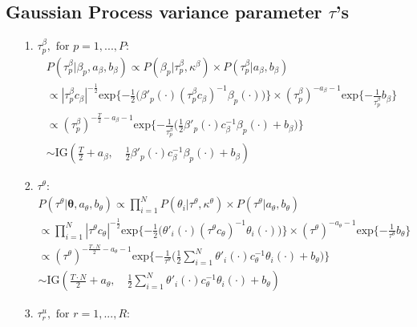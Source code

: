 \documentclass[a4paper]{article}
\begin{document}
\subsection{Gaussian Process variance parameter $\tau$'s} \label{tau}		
\begin{itemize}
	\item [1.] $\tau^{\beta}_p, \mbox{ for } p=1,...,P$:
\begin{equation*}
\begin{aligned}
&P(\tau^{\beta}_p|\beta_p, a_\beta, b_\beta) \propto P(\beta_p|\tau^{\beta}_p, \kappa^\beta) \times P(\tau^{\beta}_p|a_\beta, b_\beta) \\
&\propto|\tau^{\beta}_pc_\beta|^{-\frac{1}{2}}\mbox{exp}\{-\frac{1}{2}\Big(\beta'_p(\cdot)(\tau^{\beta}_pc_\beta)^{-1}\beta_p(\cdot)\Big)\}\times (\tau^{\beta}_p)^{-a_\beta-1}\mbox{exp}\{-\frac{1}{\tau^{\beta}_p}b_\beta\}\\
&\propto(\tau^{\beta}_p)^{-\frac{T}{2}-a_\beta-1}\mbox{exp}\{-\frac{1}{\tau^{\beta}_p}\Big(\frac{1}{2}\beta'_p(\cdot)c_\beta^{-1}\beta_p(\cdot)+b_\beta\Big)\}\\
&\sim \mbox{IG}(\frac{T}{2}+a_\beta,\quad \frac{1}{2}\beta'_p(\cdot)c_\beta^{-1}\beta_p(\cdot)+b_\beta)	
\end{aligned}
\end{equation*} 
\item [2.] $\tau^{\theta}$:
\begin{equation*}
\begin{aligned}
&P(\tau^{\theta}|\boldsymbol{\theta}, a_\theta, b_\theta) \propto \prod_{i = 1}^N P(\theta_i|\tau^{\theta}, \kappa^\theta) \times P(\tau^{\theta}|a_\theta, b_\theta) \\
&\propto \prod_{i = 1}^N |\tau^{\theta}c_\theta|^{-\frac{1}{2}}\mbox{exp}\{-\frac{1}{2}\Big(\theta'_i(\cdot)(\tau^{\theta}c_\theta)^{-1}\theta_i(\cdot)\Big)\}\times (\tau^{\theta})^{-a_\theta-1}\mbox{exp}\{-\frac{1}{\tau^{\theta}}b_\theta\}\\
&\propto(\tau^{\theta})^{-\frac{T\cdot N}{2}-a_\theta-1}\mbox{exp}\{-\frac{1}{\tau^{\theta}}\Big(\frac{1}{2}\sum_{i = 1}^N\theta'_i(\cdot)c_\theta^{-1}\theta_i(\cdot)+b_\theta\Big)\}\\
&\sim \mbox{IG}(\frac{T\cdot N}{2}+a_\theta,\quad \frac{1}{2}\sum_{i = 1}^N\theta'_i(\cdot)c_\theta^{-1}\theta_i(\cdot)+b_\theta)	
\end{aligned}
\end{equation*} 
\item [3.] $\tau^{u}_r, \mbox{ for } r=1,...,R$:
\begin{equation*}

\end{equation*}
\end{itemize}
\end{document}
